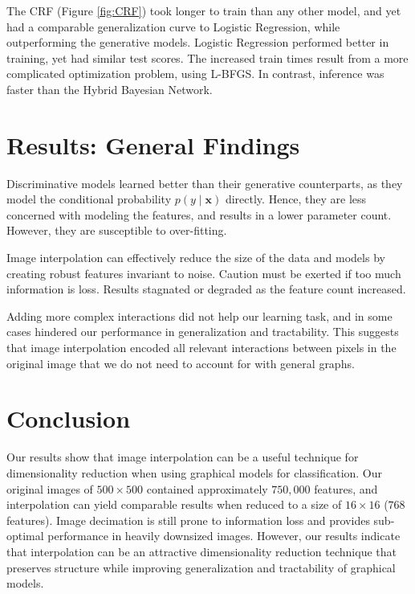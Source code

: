 \documentclass{article}
\begin{document}
The CRF (Figure \ref{fig:CRF}) took longer to train than
any other model, and yet
had a comparable generalization curve to Logistic Regression, while outperforming
the generative models. Logistic Regression performed better in training, yet
had similar test scores. The increased train times result from
a more complicated optimization problem, using L-BFGS. In contrast,
inference was faster than the Hybrid Bayesian Network.

\section{Results: General Findings}
Discriminative models learned better than their generative counterparts, as they
model the conditional probability $p(y\mid \mathbf{x})$ directly. Hence, they are
less concerned with modeling the features, and results in a lower parameter count.
However, they are susceptible to over-fitting.

Image interpolation can effectively reduce the size of the data and models
by creating robust features invariant to noise. Caution must be exerted if too
much information is loss. Results
stagnated or degraded as the feature count increased.

Adding more complex interactions did not help our learning task, and in some cases
hindered our performance in generalization and tractability. This suggests that image
interpolation encoded all relevant interactions between pixels in the original
image that we do not need to account for with general graphs.



\section{Conclusion}
\label{sec:conclusion}
Our results show that image interpolation can be a useful technique
for dimensionality reduction when using graphical models for classification.
Our original images of $500 \times 500$ contained approximately $750,000$ features,
and interpolation can yield comparable results when reduced to a size of
$16 \times 16$ ($768$ features). Image decimation is still prone to information
loss and provides sub-optimal performance in heavily downsized images. However,
our results indicate that interpolation can be an attractive dimensionality
reduction technique that preserves structure while improving generalization and
tractability of graphical models.
\end{document}

